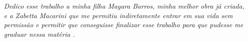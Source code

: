 \begin{dedicatoria}
   \vspace*{\fill}
   \centering
   \noindent
   \textit{
       Dedico esse trabalho a minha filha Mayara Barros, minha melhor obra já criada, e a Zabetta Macarini que me permitiu indiretamente entrar em sua vida sem permissão e permitir que conseguisse finalizar esse trabalho para que pudesse me graduar nessa matéria
       .} \vspace*{\fill}
\end{dedicatoria}
